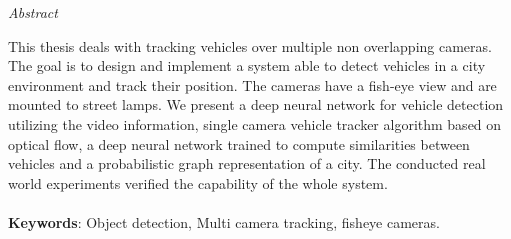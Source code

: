 \vfill
\begin{center}
{\it \large Abstract}
\vspace{0.2cm}

\begin{minipage}{0.8\textwidth}{

This thesis deals with tracking vehicles over multiple non overlapping cameras. The goal is to design and implement a system able to detect vehicles in a city environment and track their position. The cameras have a fish-eye view and are mounted to street lamps. We present a deep neural network for vehicle detection utilizing the video information, single camera vehicle tracker algorithm based on optical flow, a deep neural network trained to compute similarities between vehicles and a probabilistic graph representation of a city. The conducted real world experiments verified the capability of the whole system.
\\
\\
\textbf{Keywords}: Object detection, Multi camera tracking, fisheye cameras.
}
\end{minipage}
\end{center}
\vfill
\vspace{1cm}

